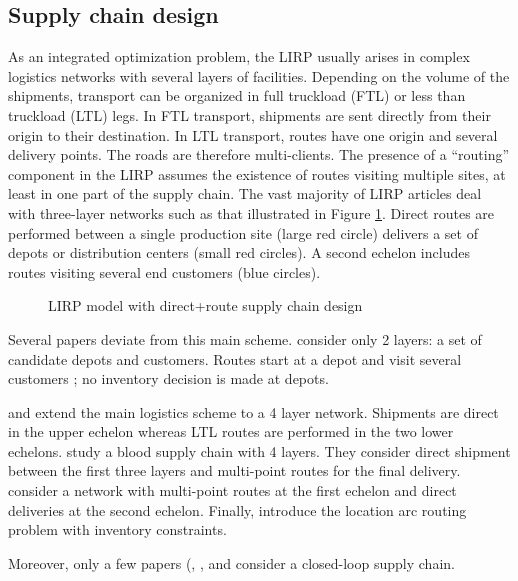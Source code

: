 \documentclass[a4paper,10pt]{article}
\begin{document}
\begin{linenumbers}
\subsection{Supply chain design}
\label{sec:l} 

As an integrated optimization problem, the LIRP usually arises in complex logistics networks with several layers of facilities. 
Depending on the volume of the shipments, transport can be organized in full truckload (FTL) or less than truckload (LTL) legs. 
In FTL transport, shipments are sent directly from their origin to their destination. In LTL transport, routes have one origin and several delivery points. The roads are therefore multi-clients. The presence of a ``routing'' component in the LIRP assumes the existence of routes visiting multiple sites, at least in one part of the supply chain.
The vast majority of LIRP articles deal with three-layer networks such as that illustrated in Figure \ref{fig:directloop}. 
Direct routes are performed between a single production site (large red circle) delivers a set of depots or distribution centers (small red circles). A second echelon includes routes visiting several end customers (blue circles).

\begin{figure}[htbp]
	\centering
	\caption{LIRP model with direct+route supply chain design}
		\label{fig:directloop}
	\end{figure}

Several papers deviate from this main scheme.  \cite{Zhang2014} consider only 2 layers: a set of candidate depots and customers. Routes start at a depot and visit several customers ; no inventory decision is made at depots. 

\cite{AmbScu05} and \cite{Tavana2018} extend the main logistics scheme to a 4 layer network. Shipments are direct in the upper echelon whereas LTL routes are performed in the two lower echelons. 
\cite{Eskandari2018} study a blood supply chain with 4 layers. They consider direct shipment between the first three layers and multi-point routes for the final delivery. 
\cite{Bashiri2018} consider a network with multi-point routes at the first echelon and direct deliveries at the second echelon. 
Finally, \cite{Riquelme2016} introduce the location arc routing problem with inventory constraints. 

Moreover, only a few papers (\cite{LiuChenLiLiu2015}, \cite{Deng2016}, \cite{Zhalechian2016} and \cite{LiGuoWangFu2013} 
consider a closed-loop supply chain. 



\end{linenumbers}
\end{document}
